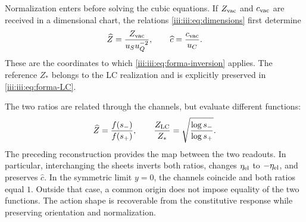 Normalization enters before solving the cubic equations.
If $Z_{\rm vac}$ and $c_{\rm vac}$ are received in a dimensional chart,
the relations \eqref{iii:iii:eq:dimensions} first determine
\[
 \widehat Z=\frac{Z_{\rm vac}}{u_Su_Q^{-2}},\qquad
 \widehat c=\frac{c_{\rm vac}}{u_C}.
\]
These are the coordinates to which
\eqref{iii:iii:eq:forma-inversion} applies. The reference $Z_*$ belongs to the
LC realization and is explicitly preserved in \eqref{iii:iii:eq:forma-LC}.

The two ratios are related through the channels, but evaluate
different functions:
\begin{equation}
 \widehat Z=\frac{f(s_-)}{f(s_+)},\qquad
 \frac{Z_{\rm LC}}{Z_*}
       =\sqrt{\frac{\log s_-}{\log s_+}}.
 \label{iii:iii:eq:forma-dos-cocientes}
\end{equation}
The preceding reconstruction provides the map between the two readouts.
In particular, interchanging the sheets inverts both ratios, changes
$\eta_{\rm el}$ to $-\eta_{\rm el}$, and preserves $\widehat c$.
In the symmetric limit $y=0$, the channels coincide and both ratios
equal $1$. Outside that case, a common origin does not impose equality
of the two functions. The action shape is recoverable from the
constitutive response while preserving orientation and normalization.
